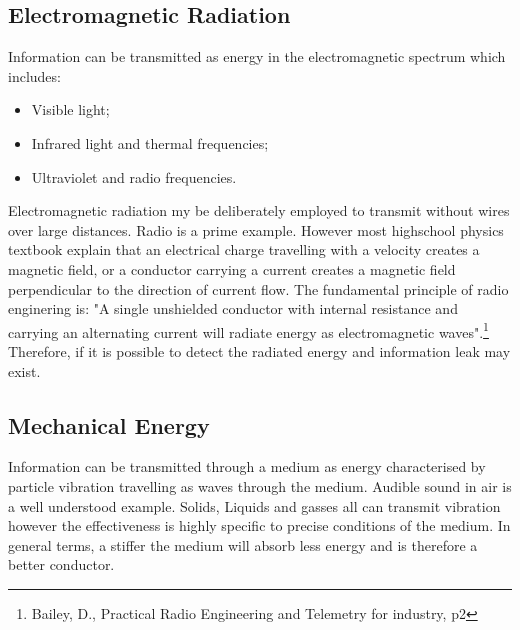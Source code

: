 \subsection{Electromagnetic Radiation}
Information can be transmitted as energy in the electromagnetic spectrum which includes:
\begin{itemize}
	\item Visible light;
	\item Infrared light and thermal frequencies;
	\item Ultraviolet and radio frequencies.
\end{itemize}
Electromagnetic radiation my be deliberately employed to transmit without wires over large distances. Radio is a prime example. However most highschool physics textbook explain that an electrical charge travelling with a velocity creates a magnetic field, or a conductor carrying a current creates a magnetic field perpendicular to the direction of current flow. 
The fundamental principle of radio enginering is: "A single unshielded conductor with internal resistance and carrying an alternating current will radiate energy as electromagnetic waves".\footnote{Bailey, D., Practical Radio Engineering and Telemetry for industry, p2} Therefore, if it is possible to detect the radiated energy and information leak may exist. 
\subsection{Mechanical Energy}
Information can be transmitted through a medium as energy characterised by particle vibration travelling as waves through the medium.
Audible sound in air is a well understood example.
Solids, Liquids and gasses all can transmit vibration however the effectiveness is highly specific to precise conditions of the medium. In general terms, a stiffer the medium will absorb less energy and is therefore a better conductor.